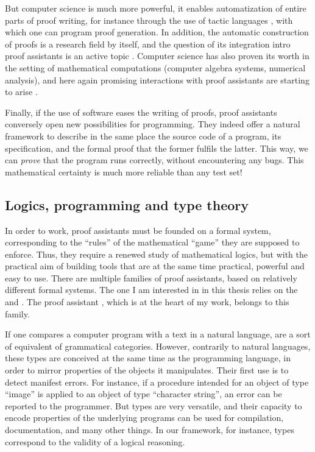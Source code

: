 But computer science is much more powerful, it enables automatization of entire parts of
proof writing, for instance through the use of tactic languages ,
with which one can program proof generation.
In addition, the automatic construction of proofs is a research field by itself,
and the question of its integration intro proof assistants is an active topic
. Computer science has also proven its worth in the
setting of mathematical computations (computer algebra systems, numerical analysis),
and here again promising interactions with proof assistants are starting to arise
.

Finally, if the use of software eases the writing of proofs, proof assistants conversely
open new possibilities for programming. They indeed offer a natural framework to describe in
the same place the source code of a program, its specification, and the formal proof that the
former fulfils the latter. This way, we can \emph{prove} that the program runs correctly,
without encountering any bugs.
This mathematical certainty is much more reliable than any test set!

\subsection{Logics, programming and type theory}

In order to work, proof assistants must be founded on a formal system, corresponding to
the “rules” of the mathematical “game” they are supposed to enforce.
Thus, they require a renewed study of mathematical logics, but with the practical aim of
building tools that are at the same time practical, powerful and easy to use.
There are multiple families of proof assistants, based on relatively different formal systems.
The one I am interested in in this thesis relies on the 
and . The proof assistant ,
which is at the heart of my work, belongs to this family.

If one compares a computer program with a text in a natural language, 
are a sort of equivalent of grammatical categories. However, contrarily to natural
languages, these types are conceived at the same time as the programming language, in order
to mirror properties of the objects it manipulates.
Their first use is to detect manifest errors. For instance, if a procedure
intended for an object of type “image” is applied to an object of type “character string”,
an error can be reported to the programmer.%
%
But types are very versatile, and their capacity to encode properties of the underlying
programs can be used for compilation, documentation, and many other things. In our
framework, for instance, types correspond to the validity of a logical reasoning.

